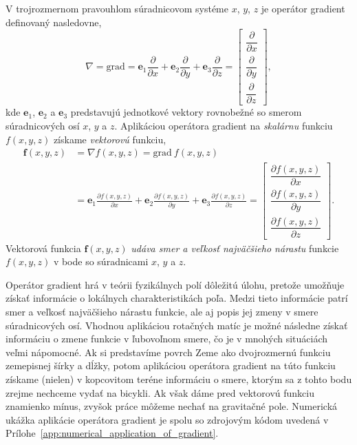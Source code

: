 \documentclass[a4paper, 12pt]{book}
\newcommand{\grad}{\mathrm{grad}}
\let\vec\mathbf
\begin{document}
V trojrozmernom pravouhlom súradnicovom systéme $x$, $y$, $z$ je operátor 
gradient definovaný nasledovne,
%
\begin{equation}
\label{eq:gradient}
\nabla = \grad = \vec e_1 \frac{\partial}{\partial x} + \vec e_2 
\frac{\partial}{\partial y} + \vec e_3 \frac{\partial}{\partial z} =
\begin{bmatrix}
\dfrac{\partial}{\partial x} \\[2ex]
\dfrac{\partial}{\partial y} \\[2ex]
\dfrac{\partial}{\partial z}
\end{bmatrix}
{,}
\end{equation}
%
kde $\vec e_1$, $\vec e_2$ a $\vec e_3$ predstavujú jednotkové vektory 
rovnobežné so smerom súradnicových osí $x$, $y$ a $z$.  Aplikáciou operátora 
gradient na \emph{skalárnu} funkciu $f(x, y, z)$ získame \emph{vektorovú} 
funkciu,
%
\begin{equation}
\begin{split}
\vec f(x, y, z) &= \nabla f(x, y, z) = \grad \ f(x, y, z)\\
%
&= \vec e_1 \frac{\partial f(x, y, z)}{\partial x} + \vec e_2 \frac{\partial 
f(x, y, z)}{\partial y} + \vec e_3 \frac{\partial f(x, y, z)}{\partial z} =
\begin{bmatrix}
\dfrac{\partial f(x, y, z)}{\partial x} \\[2ex]
\dfrac{\partial f(x, y, z)}{\partial y} \\[2ex]
\dfrac{\partial f(x, y, z)}{\partial z}
\end{bmatrix}
{.}
\end{split}
\end{equation}
%
Vektorová funkcia $\vec f(x, y, z)$ \emph{udáva smer a veľkosť najväčšieho 
nárastu} funkcie $f(x, y, z)$ v bode so súradnicami $x$, $y$ a $z$.

Operátor gradient hrá v teórii fyzikálnych polí dôležitú úlohu, pretože 
umožňuje získať informácie o lokálnych charakteristikách poľa.  Medzi tieto 
informácie patrí smer a veľkosť najväčšieho nárastu funkcie, ale aj popis jej 
zmeny v smere súradnicových osí.  Vhodnou aplikáciou rotačných matíc je možné 
následne získať informáciu o zmene funkcie v ľubovoľnom smere, čo je v mnohých 
situáciách veľmi nápomocné.  Ak si predstavíme povrch Zeme ako dvojrozmernú 
funkciu zemepisnej šírky a dĺžky, potom aplikáciou operátora gradient na túto 
funkciu získame (nielen) v kopcovitom teréne informáciu o smere, ktorým sa 
z tohto bodu zrejme nechceme vydať na bicykli.  Ak však dáme pred vektorovú 
funkciu znamienko mínus, zvyšok práce môžeme nechať na gravitačné pole.  
Numerická ukážka aplikácie operátora gradient je spolu so zdrojovým kódom 
uvedená v Prílohe~\ref{app:numerical_application_of_gradient}.
\end{document}
